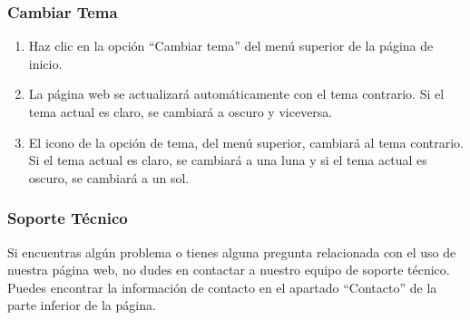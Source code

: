 \subsubsection{Cambiar Tema}
\begin{enumerate}
	\item Haz clic en la opción “Cambiar tema” del menú superior de la página de inicio.
	\item La página web se actualizará automáticamente con el tema contrario. Si el tema actual es claro, se cambiará a oscuro y viceversa.
	\item El icono de la opción de tema, del menú superior, cambiará al tema contrario. Si el tema actual es claro, se cambiará a una luna y si el tema actual es oscuro, se cambiará a un sol.
\end{enumerate}

\subsubsection{Soporte Técnico}
Si encuentras algún problema o tienes alguna pregunta relacionada con el uso de nuestra página web, no dudes en contactar a nuestro equipo de soporte técnico. Puedes encontrar la información de contacto en el apartado “Contacto” de la parte inferior de la página.